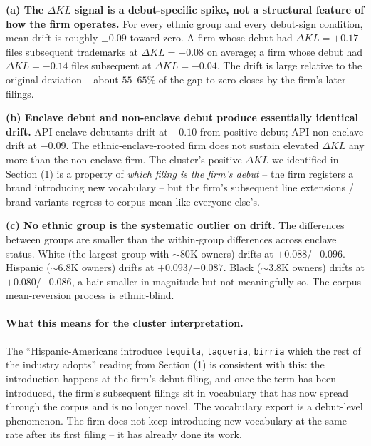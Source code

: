 \documentclass[11pt]{article}
\begin{document}
\textbf{(a) The $\Delta KL$ signal is a debut-specific spike, not a
structural feature of how the firm operates.} For every ethnic
group and every debut-sign condition, mean drift is roughly
$\pm 0.09$ toward zero. A firm whose debut had $\Delta KL = +0.17$
files subsequent trademarks at $\Delta KL = +0.08$ on average; a
firm whose debut had $\Delta KL = -0.14$ files subsequent at
$\Delta KL = -0.04$. The drift is large relative to the original
deviation -- about $55$--$65\%$ of the gap to zero closes by the
firm's later filings.

\textbf{(b) Enclave debut and non-enclave debut produce essentially
identical drift.} API enclave debutants drift at $-0.10$ from
positive-debut; API non-enclave drift at $-0.09$. The
ethnic-enclave-rooted firm does not sustain elevated $\Delta KL$ any
more than the non-enclave firm. The cluster's positive $\Delta KL$
we identified in Section (1) is a property of \emph{which filing
is the firm's debut} -- the firm registers a brand introducing new
vocabulary -- but the firm's subsequent line extensions / brand
variants regress to corpus mean like everyone else's.

\textbf{(c) No ethnic group is the systematic outlier on drift.}
The differences between groups are smaller than the within-group
differences across enclave status. White (the largest group with
$\sim 80$K owners) drifts at $+0.088$/$-0.096$. Hispanic
($\sim 6.8$K owners) drifts at $+0.093$/$-0.087$. Black ($\sim 3.8$K
owners) drifts at $+0.080$/$-0.086$, a hair smaller in magnitude
but not meaningfully so. The corpus-mean-reversion process is
ethnic-blind.

\paragraph{What this means for the cluster interpretation.}
The ``Hispanic-Americans introduce \texttt{tequila}, \texttt{taqueria},
\texttt{birria} which the rest of the industry adopts'' reading from
Section (1) is consistent with this: the introduction happens at
the firm's debut filing, and once the term has been introduced,
the firm's subsequent filings sit in vocabulary that has now spread
through the corpus and is no longer novel. The vocabulary export is
a debut-level phenomenon. The firm does not keep introducing new
vocabulary at the same rate after its first filing -- it has
already done its work.
\end{document}
